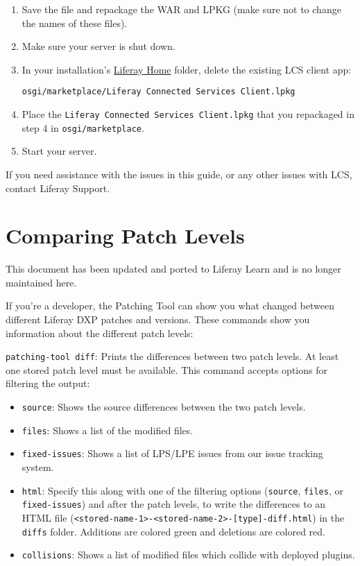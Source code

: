 \begin{enumerate}
\begin{verbatim}
        <logger additivity="false" name="com.liferay.lcs">
                <level value="ALL" />
                <appender-ref ref="RollingFileAppender" />
        </logger>
</log4j:configuration>
\end{verbatim}
\item
  Save the file and repackage the WAR and LPKG (make sure not to change
  the names of these files).
\item
  Make sure your server is shut down.
\item
  In your installation's
  \href{/docs/7-2/deploy/-/knowledge_base/d/liferay-home}{Liferay Home}
  folder, delete the existing LCS client app:

\begin{verbatim}
osgi/marketplace/Liferay Connected Services Client.lpkg
\end{verbatim}
\item
  Place the \texttt{Liferay\ Connected\ Services\ Client.lpkg} that you
  repackaged in step 4 in \texttt{osgi/marketplace}.
\item
  Start your server.
\end{enumerate}

If you need assistance with the issues in this guide, or any other
issues with LCS, contact Liferay Support.

\chapter{Comparing Patch Levels}\label{comparing-patch-levels}

{This document has been updated and ported to Liferay Learn and is no
longer maintained here.}

If you're a developer, the Patching Tool can show you what changed
between different Liferay DXP patches and versions. These commands show
you information about the different patch levels:

\texttt{patching-tool\ diff}: Prints the differences between two patch
levels. At least one stored patch level must be available. This command
accepts options for filtering the output:

\begin{itemize}
\tightlist
\item
  \texttt{source}: Shows the source differences between the two patch
  levels.
\item
  \texttt{files}: Shows a list of the modified files.
\item
  \texttt{fixed-issues}: Shows a list of LPS/LPE issues from our issue
  tracking system.
\item
  \texttt{html}: Specify this along with one of the filtering options
  (\texttt{source}, \texttt{files}, or \texttt{fixed-issues}) and after
  the patch levels, to write the differences to an HTML file
  (\texttt{\textless{}stored-name-1\textgreater{}-\textless{}stored-name-2\textgreater{}-{[}type{]}-diff.html})
  in the \texttt{diffs} folder. Additions are colored green and
  deletions are colored red.
\item
  \texttt{collisions}: Shows a list of modified files which collide with
  deployed plugins.
\end{itemize}

